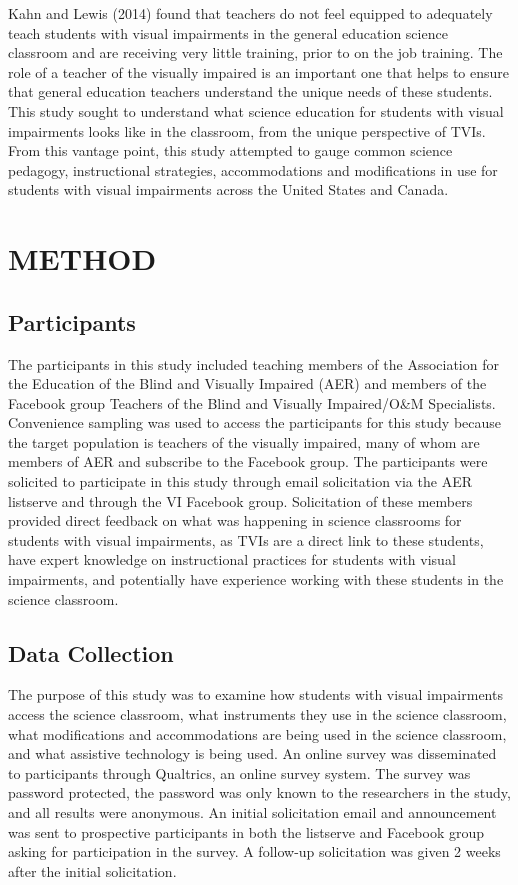 \documentclass[11.5pt]{sig-alternate} %
\begin{document}
\begin{large}
Kahn and Lewis (2014) found that teachers do not feel equipped to adequately teach students with visual impairments in the general education science classroom and are receiving very little training, prior to on the job training.  The role of a teacher of the visually impaired is an important one that helps to ensure that general education teachers understand the unique needs of these students.  
This study sought to understand what science education for students with visual impairments looks like in the classroom, from the unique perspective of TVIs.  From this vantage point, this study attempted to gauge common science pedagogy, instructional strategies, accommodations and modifications in use for students with visual impairments across the United States and Canada. 


\section*{METHOD}
\subsection*{Participants}

The participants in this study included teaching members of the Association for the Education of the Blind and Visually Impaired (AER) and members of the Facebook group Teachers of the Blind and Visually Impaired/O\&M Specialists.  Convenience sampling was used to access the participants for this study because the target population is teachers of the visually impaired, many of whom are members of AER and subscribe to the Facebook group. The participants were solicited to participate in this study through email solicitation via the AER listserve and through the VI Facebook group.  Solicitation of these members provided direct feedback on what was happening in science classrooms for students with visual impairments, as TVIs are a direct link to these students, have expert knowledge on instructional practices for students with visual impairments, and potentially have experience working with these students in the science classroom. 

\subsection*{Data Collection}

The purpose of this study was to examine how students with visual impairments access the science classroom, what instruments they use in the science classroom, what modifications and accommodations are being used in the science classroom, and what assistive technology is being used.  An online survey was disseminated to participants through Qualtrics, an online survey system.  The survey was password protected, the password was only known to the researchers in the study, and all results were anonymous. An initial solicitation email and announcement was sent to prospective participants in both the listserve and Facebook group asking for participation in the survey.   A follow-up solicitation was given 2 weeks after the initial solicitation.  


\end{large}
\end{document}

